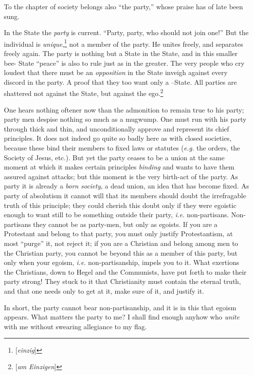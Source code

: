 \myhrule


To the chapter of society belongs also ``the party,'' whose praise has of 
late been sung.

In the State the \textit{party} is current. ``Party, party, who should not 
join one!'' But the individual is 
\textit{unique},\footnote{[\textit{einzig}]} not a member of the party. He 
unites freely, and separates freely again. The party is nothing but a State in 
the State, and in this smaller bee- State ``peace'' is also to rule just as 
in the greater. The very people who cry loudest that there must be an 
\textit{opposition} in the State inveigh against every discord in the party. A 
proof that they too want only a --State. All parties are shattered not against 
the State, but against the ego.\footnote{[\textit{am Einzigen}]}

One hears nothing oftener now than the admonition to remain true to his party; 
party men despise nothing so much as a mugwump. One must run with his party 
through thick and thin, and unconditionally approve and represent its chief 
principles. It does not indeed go quite so badly here as with closed 
societies, because these bind their members to fixed laws or statutes 
(\textit{e.g.} the orders, the Society of Jesus, etc.). But yet the party 
ceases to be a union at the same moment at which it makes certain principles 
\textit{binding} and wants to have them assured against attacks; but this 
moment is the very birth-act of the party. As party it is already a 
\textit{born society}, a dead union, an idea that has become fixed. As party 
of absolutism it cannot will that its members should doubt the irrefragable 
truth of this principle; they could cherish this doubt only if they were 
egoistic enough to want still to be something outside their party, 
\textit{i.e.} non-partisans. Non-partisans they cannot be as party-men, but 
only as egoists. If you are a Protestant and belong to that party, you must 
only justify Protestantism, at most ``purge'' it, not reject it; if you are 
a Christian and belong among men to the Christian party, you cannot be beyond 
this as a member of this party, but only when your egoism, \textit{i.e.} 
non-partisanship, impels you to it. What exertions the Christians, down to 
Hegel and the Communists, have put forth to make their party strong! They 
stuck to it that Christianity must contain the eternal truth, and that one 
needs only to get at it, make sure of it, and justify it.

In short, the party cannot bear non-partisanship, and it is in this that 
egoism appears. What matters the party to me? I shall find enough anyhow who 
\textit{unite} with me without swearing allegiance to my flag.

